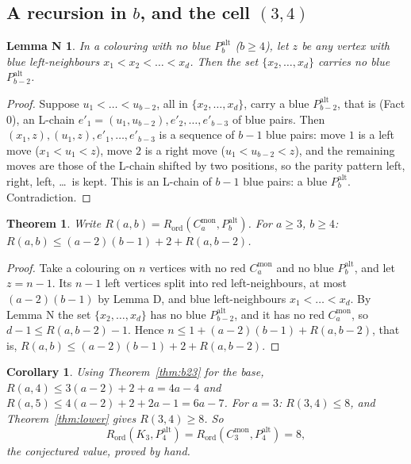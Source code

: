 \documentclass[11pt]{article}
\newcommand{\Rord}{R_{\mathrm{ord}}}
\newcommand{\Cmon}[1]{C_{#1}^{\mathrm{mon}}}
\newcommand{\Palt}[1]{P_{#1}^{\mathrm{alt}}}
\theoremstyle{plain}
\newtheorem{theorem}{Theorem}
\newtheorem{corollary}{Corollary}
\newtheorem*{lemmaN}{Lemma N}
\theoremstyle{remark}
\begin{document}
\subsection{A recursion in $b$, and the cell $(3,4)$}

\begin{lemmaN}
In a colouring with no blue $\Palt{b}$ ($b \geq 4$), let $z$ be any vertex with blue left-neighbours
$x_1 < x_2 < \dots < x_d$. Then the set $\{x_2, \dots, x_d\}$ carries no blue $\Palt{b-2}$.
\end{lemmaN}

\begin{proof}
Suppose $u_1 < \dots < u_{b-2}$, all in $\{x_2, \dots, x_d\}$, carry a blue $\Palt{b-2}$, that is (Fact 0), an
L-chain $e'_1 = (u_1, u_{b-2}), e'_2, \dots, e'_{b-3}$ of blue pairs. Then
$(x_1, z), (u_1, z), e'_1, \dots, e'_{b-3}$ is a sequence of $b-1$ blue pairs: move $1$ is a left move
($x_1 < u_1 < z$), move $2$ is a right move ($u_1 < u_{b-2} < z$), and the remaining moves are those of the
L-chain shifted by two positions, so the parity pattern left, right, left, \dots\ is kept. This is an L-chain of
$b-1$ blue pairs: a blue $\Palt{b}$. Contradiction.
\end{proof}

\begin{theorem}\label{thm:rec}
Write $R(a,b) = \Rord(\Cmon{a}, \Palt{b})$. For $a \geq 3$, $b \geq 4$:
$R(a,b) \leq (a-2)(b-1) + 2 + R(a,b-2)$.
\end{theorem}

\begin{proof}
Take a colouring on $n$ vertices with no red $\Cmon{a}$ and no blue $\Palt{b}$, and let $z = n-1$. Its $n-1$ left
vertices split into red left-neighbours, at most $(a-2)(b-1)$ by Lemma D, and blue left-neighbours
$x_1 < \dots < x_d$. By Lemma N the set $\{x_2, \dots, x_d\}$ has no blue $\Palt{b-2}$, and it has no red
$\Cmon{a}$, so $d - 1 \leq R(a,b-2) - 1$. Hence $n \leq 1 + (a-2)(b-1) + R(a,b-2)$, that is,
$R(a,b) \leq (a-2)(b-1) + 2 + R(a,b-2)$.
\end{proof}

\begin{corollary}\label{cor:rec}
Using Theorem~\ref{thm:b23} for the base, $R(a,4) \leq 3(a-2) + 2 + a = 4a-4$ and
$R(a,5) \leq 4(a-2) + 2 + 2a-1 = 6a-7$. For $a = 3$: $R(3,4) \leq 8$, and Theorem~\ref{thm:lower} gives
$R(3,4) \geq 8$. So
\[
  \Rord(K_3, \Palt{4}) = \Rord(\Cmon{3}, \Palt{4}) = 8 ,
\]
the conjectured value, proved by hand.
\end{corollary}
\end{document}
